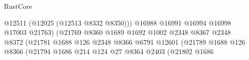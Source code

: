 \begin{lexlean}{RustCore}
\begin{coremodule}
                                                                @12511
                                                                (@12025 (@12513 @8332 @8350)))
                                                              @16988
                                                              @16991
                                                              @16994
                                                              @16998
                                                              @17003
                                                              @21763)
                                                            (@21769
                                                              @8360
                                                              @1689
                                                              @1692
                                                              @1002
                                                              @2348
                                                              @8367
                                                              @2348
                                                              @8372
                                                              (@21781
                                                                @1688
                                                                @126
                                                                @2348
                                                                @8366
                                                                @6791
                                                                @12601
                                                                (@21789
                                                                  @1688
                                                                  @126
                                                                  @8366
                                                                  (@21794
                                                                    @1686
                                                                    @214
                                                                    @124
                                                                    @27
                                                                    @8364
                                                                    @2403
                                                                    (@21802
                                                                      @1686

\end{coremodule}
\end{lexlean}
